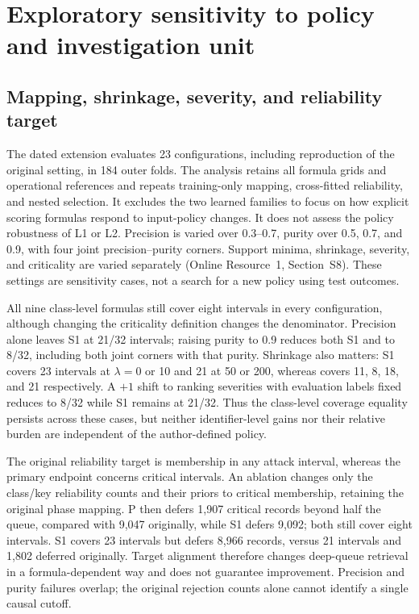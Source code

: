 \section{Exploratory sensitivity to policy and investigation unit}
\label{sec:sensitivity}

\subsection{Mapping, shrinkage, severity, and reliability target}
The dated extension evaluates 23 configurations, including reproduction of the original setting, in 184 outer folds. The analysis retains all formula grids and operational references and repeats training-only mapping, cross-fitted reliability, and nested selection. It excludes the two learned families to focus on how explicit scoring formulas respond to input-policy changes. It does not assess the policy robustness of L1 or L2. Precision is varied over 0.3--0.7, purity over 0.5, 0.7, and 0.9, with four joint precision--purity corners. Support minima, shrinkage, severity, and criticality are varied separately (Online Resource~1, Section~S8). These settings are sensitivity cases, not a search for a new policy using test outcomes.

All nine class-level formulas still cover eight intervals in every configuration, although changing the criticality definition changes the denominator. Precision alone leaves S1\key{} at 21/32 intervals; raising purity to 0.9 reduces both S1\key{} and \Rsev{} to 8/32, including both joint corners with that purity. Shrinkage also matters: S1\key{} covers 23 intervals at $\lambda=0$ or 10 and 21 at 50 or 200, whereas \Rsev{} covers 11, 8, 18, and 21 respectively. A $+1$ shift to ranking severities with evaluation labels fixed reduces \Rsev{} to 8/32 while S1\key{} remains at 21/32. Thus the class-level coverage equality persists across these cases, but neither identifier-level gains nor their relative burden are independent of the author-defined policy.

The original reliability target is membership in any attack interval, whereas the primary endpoint concerns critical intervals. An ablation changes only the class/key reliability counts and their priors to critical membership, retaining the original phase mapping. P then defers 1,907 critical records beyond half the queue, compared with 9,047 originally, while S1 defers 9,092; both still cover eight intervals. S1\key{} covers 23 intervals but defers 8,966 records, versus 21 intervals and 1,802 deferred originally. Target alignment therefore changes deep-queue retrieval in a formula-dependent way and does not guarantee improvement. Precision and purity failures overlap; the original rejection counts alone cannot identify a single causal cutoff.

